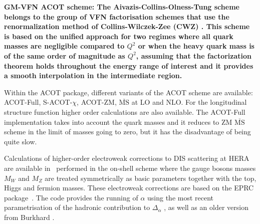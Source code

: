 \begin{description}
\item \bf {GM-VFN ACOT scheme:} \rm
The Aivazis-Collins-Olness-Tung scheme belongs to the group of VFN factorisation 
schemes that use the renormalization method of Collins-Wilczek-Zee (CWZ) \cite{CWZ}.
This scheme is based on the unified approach for two regimes where all quark masses are 
negligible compared to $Q^2$ or when the heavy quark mass is of the same order of magnitude as $Q^2$, 
assuming that the factorization theorem holds throughout the energy range of interest
and it provides a smooth interpolation in the intermediate region.  

Within the ACOT package, different variants of the ACOT scheme are available:
ACOT-Full, S-ACOT-$\chi$, ACOT-ZM, $\overline{\text{MS}}$ at LO and NLO. 
For the longitudinal structure function higher order calculations are also available. 
The ACOT-Full implementation takes into account the quark masses 
and it reduces to ZM $\overline{\text{MS}}$ scheme in the limit of masses going to zero, 
but it has the disadvantage of being quite slow.

\vspace{0.1cm}
\end{description}

Calculations of higher-order electroweak corrections to DIS scattering at 
HERA are available in \fitter\, performed in the on-shell scheme 
where the gauge bosons masses $M_W$ and 
$M_Z$ are treated symmetrically as basic parameters together with the top, 
Higgs and fermion masses.
These electroweak corrections 
are based on the EPRC package~\cite{SpiesbergerPrivComm}.
The code provides the running of $\alpha$ using the most recent parametrisation
of the hadronic contribution to $\Delta_\alpha$ \cite{Jegerlehner}, as well as 
an older version from Burkhard \cite{Burkhard}.



